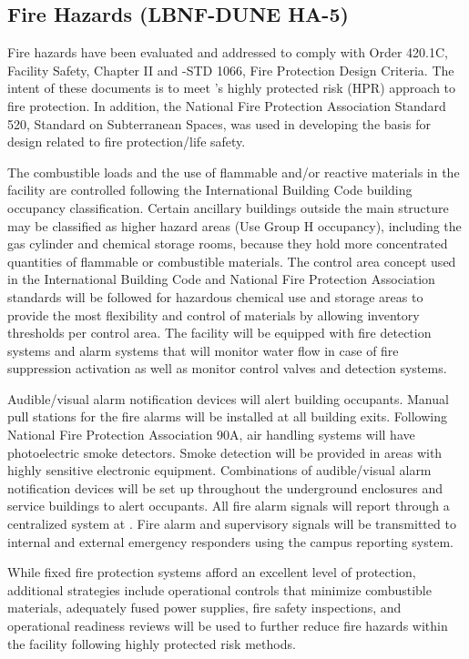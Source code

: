 \subsection{Fire Hazards (LBNF-DUNE HA-5)}

Fire hazards have been evaluated and addressed to comply with
 Order 420.1C, Facility Safety, Chapter II and
-STD 1066, Fire Protection Design Criteria.  The intent of
these documents is to meet 's highly protected risk (HPR)
approach to fire protection.  In addition, the National Fire
Protection Association Standard 520, Standard on Subterranean Spaces,
was used in developing the basis for design related to fire
protection/life safety.

The combustible loads and the use of flammable and/or reactive
materials in the  facility are controlled
following the International Building Code building occupancy
classification. Certain ancillary buildings outside the main structure
may be classified as higher hazard areas (Use Group H occupancy),
including the gas cylinder and chemical storage rooms, because they
hold more concentrated quantities of flammable or combustible
materials.  The control area concept used in the International
Building Code and National Fire Protection Association standards will
be followed for hazardous chemical use and storage areas to provide
the most flexibility and control of materials by allowing inventory
thresholds per control area.  The  facility
will be equipped with fire detection systems and alarm systems that
will monitor water flow in case of fire suppression activation as well
as monitor control valves and detection systems.

Audible/visual alarm notification devices will alert building
occupants.  Manual pull stations for the fire alarms will be installed
at all building exits.  Following National Fire Protection Association
90A, air handling systems will have photoelectric smoke detectors.
Smoke detection will be provided in areas with highly sensitive
electronic equipment.  Combinations of audible/visual alarm
notification devices will be set up throughout the underground
enclosures and service buildings to alert occupants. All fire alarm
signals will report through a centralized system at .
Fire alarm and supervisory signals will be transmitted to internal and
external emergency responders using the campus reporting system.

While fixed fire protection systems afford an excellent level
of protection, additional strategies include operational controls
that minimize combustible materials, adequately
fused power supplies, fire safety inspections, and operational
readiness reviews will be used to further reduce fire hazards
within the facility following  highly protected risk methods.


